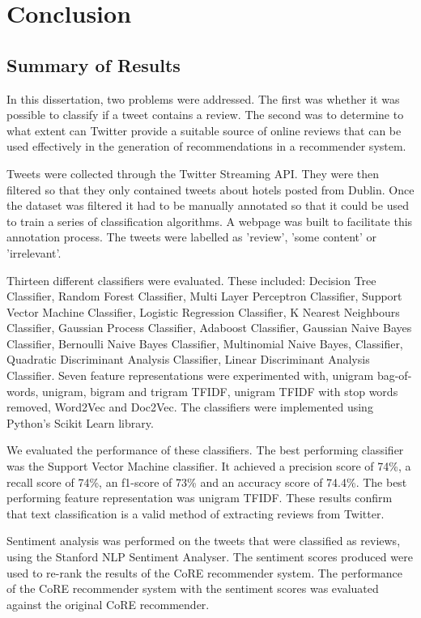 \chapter{Conclusion}

\section{Summary of Results}

In this dissertation, two problems were addressed. The first was whether it was possible to classify if a tweet contains a review. The second was to determine to what extent can Twitter provide a suitable source of online reviews that can be used effectively in the generation of recommendations in a recommender system.

Tweets were collected through the Twitter Streaming API. They were then filtered so that they only contained tweets about hotels posted from Dublin. Once the dataset was filtered it had to be manually annotated so that it could be used to train a series of classification algorithms. A webpage was built to facilitate this annotation process. The tweets were labelled as 'review', 'some content' or 'irrelevant'.

Thirteen different classifiers were evaluated. These included: Decision Tree Classifier, Random Forest Classifier, Multi Layer Perceptron Classifier, Support Vector Machine Classifier, Logistic Regression Classifier, K Nearest Neighbours Classifier, Gaussian Process Classifier, Adaboost Classifier, Gaussian Naive Bayes Classifier, Bernoulli Naive Bayes Classifier, Multinomial Naive Bayes, Classifier, Quadratic Discriminant Analysis Classifier, Linear Discriminant Analysis Classifier. Seven feature representations were experimented with, unigram bag-of-words, unigram, bigram and trigram TFIDF, unigram TFIDF with stop words removed, Word2Vec and Doc2Vec. The classifiers were implemented using Python's Scikit Learn library.

We evaluated the performance of these classifiers. The best performing classifier was the Support Vector Machine classifier. It achieved a precision score of 74\%, a recall score of 74\%, an f1-score of 73\% and an accuracy score of 74.4\%. The best performing feature representation was unigram TFIDF. These results confirm that text classification is a valid method of extracting reviews from Twitter. 

Sentiment analysis was performed on the tweets that were classified as reviews, using the Stanford NLP Sentiment Analyser. The sentiment scores produced were used to re-rank the results of the CoRE recommender system. The performance of the CoRE recommender system with the sentiment scores was evaluated against the original CoRE recommender.

